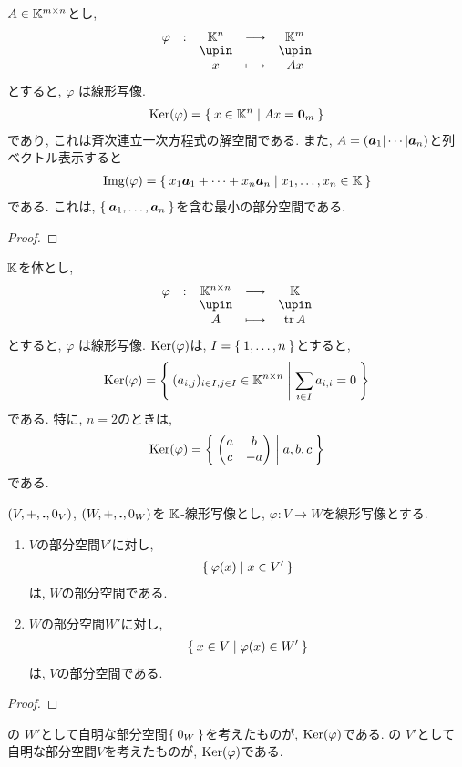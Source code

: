 \begin{example}
  $A\in \mathbb{K}^{m\times n}$とし,
  \begin{align*}
    \shazo{\varphi}{\KK^{n}}{\KK^{m}}
    {x}{Ax}
  \end{align*}
  とすると, $\varphi$
  は線形写像.
  \begin{align*}
    \operatorname{Ker}(\varphi)=\Set{x\in\mathbb{K}^n|Ax=\boldsymbol{0}_m}
  \end{align*}
  であり, これは斉次連立一次方程式の解空間である.
  また, $A=(\boldsymbol{a}_1|\cdots|\boldsymbol{a}_n)$と列ベクトル表示すると
  \begin{align*}
    \operatorname{Img}(\varphi)=\Set{x_1\boldsymbol{a}_1+\cdots+x_n\boldsymbol{a}_n|x_1,\ldots,x_n\in \mathbb{K}}
  \end{align*}
  である. これは, $\Set{\boldsymbol{a}_1,\ldots,\boldsymbol{a}_n}$を含む最小の部分空間である.
\end{example}
\begin{proof}\end{proof}

\begin{example}
$\mathbb{K}$を体とし,  
  \begin{align*}
    \shazo{\varphi}{\KK^{n\times n}}{\KK}
    {A}{\tr A}
  \end{align*}
  とすると, $\varphi$
  は線形写像.
  $\operatorname{Ker}(\varphi)$は, $I=\Set{1,\dots,n}$とすると,
  \begin{align*}
    \operatorname{Ker}(\varphi)=
    \Set{(a_{i,j})_{i\in I,j\in I} \in\mathbb{K}^{n\times n}|\sum_{i\in I}a_{i,i}=0}
  \end{align*}
  である. 特に, $n=2$のときは,
  \begin{align*}
    \operatorname{Ker}(\varphi)=
    \Set{\begin{pmatrix}a&b\\c&-a\end{pmatrix}|a,b,c}
  \end{align*}
  である.
\end{example}

\begin{prop}
  \label{subspace:prop:img:inverseimage}
  $(V,+,\mathbin{\boldsymbol{.}},0_V)$,
  $(W,+,\mathbin{\boldsymbol{.}},0_W)$を
  $\mathbb{K}$-線形写像とし,
  $\varphi\colon V\to W$を線形写像とする.
  \begin{enumerate}
  \item
    $V$の部分空間$V'$に対し,
    \begin{align*}
      \Set{\varphi(x)|x\in V'}
    \end{align*}
    は, $W$の部分空間である.
  \item
    $W$の部分空間$W'$に対し,
    \begin{align*}
      \Set{x\in V|\varphi(x)\in W'}
    \end{align*}
    は, $V$の部分空間である.
  \end{enumerate}
\end{prop}
\begin{proof}\end{proof}
\begin{remark}
  の
  $W'$として自明な部分空間$\Set{0_W}$を考えたものが,
  $\operatorname{Ker}(\varphi)$である.
  の
  $V'$として自明な部分空間$V$を考えたものが,
  $\operatorname{Ker}(\varphi)$である.
\end{remark}

